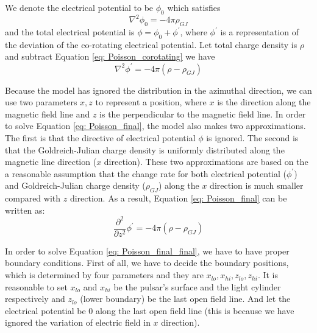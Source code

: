 \documentclass[12pt]{report}
\newcommand{\gj}[0]{
  Goldreich-Julian charge density
}
\begin{document}
      We denote the electrical potential to be $\phi_{0}$ which satisfies 
      \begin{equation}
        \label{eq: Poisson_corotating}
        \nabla^{2}\phi_{0} = -4\pi\rho_{GJ}
      \end{equation}
      and the total electrical potential is $\phi = \phi_{0} + \phi^{\prime}$, where $\phi^{\prime}$ is a 
      representation of the deviation of the co-rotating electrical potential.  
      Let total charge density is $\rho$ and subtract Equation \ref{eq: Poisson_corotating} we have 
      \begin{equation}
        \label{eq: Poisson_final}
        \nabla^{2}\phi^{\prime} = -4\pi\left(\rho - \rho_{GJ} \right)
      \end{equation}

      Because the model has ignored the distribution in the azimuthal direction, we can use two parameters 
      $x, z$ to represent a position, where $x$ is the direction along the magnetic field line and $z$ is the 
      perpendicular to the magnetic field line. In order to solve Equation \ref{eq: Poisson_final}, 
      the model also makes two approximations. The first is that the directive of electrical potential $\phi$ 
      is ignored. The second is that the \gj{} is uniformly distributed along the magnetic line direction 
      ($x$ direction). These two approximations are based on the a reasonable assumption that the change rate 
      for both electrical potential ($\phi^{\prime}$) and \gj{}($\rho_{GJ}$) along the $x$ direction is much 
      smaller compared with $z$ direction. 
      As a result, Equation \ref{eq: Poisson_final} can be written as: 
      \begin{equation}
        \label{eq: Poisson_final_final}
        \frac{\partial^2}{\partial z^2} \phi^{\prime} = -4\pi\left(\rho - \rho_{GJ} \right)
      \end{equation}

      In order to solve Equation \ref{eq: Poisson_final_final}, we have to have proper boundary conditions. 
      First of all, we have to decide the boundary positions, which is determined by four parameters and they are  
      $x_{lo}, x_{hi}, z_{lo}, z_{hi}$. It is reasonable to set $x_{lo}$ and $x_{hi}$
      be the pulsar's surface and the light cylinder respectively and $z_{lo}$ (lower boundary) be the last open 
      field line. And let the electrical potential be $0$ along the last open field line (this is because we have 
      ignored the variation of electric field in $x$ direction).   
\end{document}
